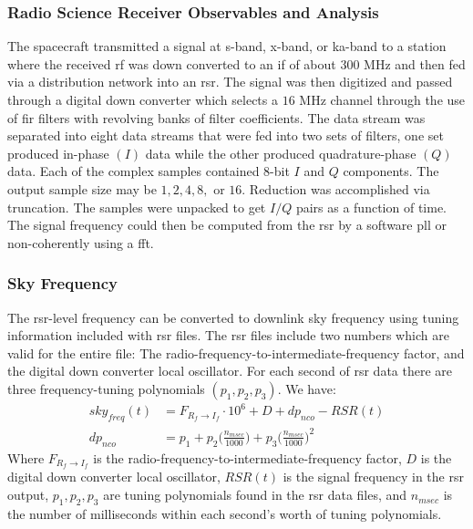 \documentclass[crop=false,class=article,oneside]{standalone}
\begin{document}
        \subsubsection{%
            Radio Science Receiver Observables and Analysis
        }
            The spacecraft transmitted a signal at
            \gls{s-band}, \gls{x-band}, or \gls{ka-band} to
            a station where the received \gls{rf} was down
            converted to an \gls{if} of about $300$ MHz and
            then fed via a \gls{distribution network} into
            an \gls{rsr}. The signal was then digitized and
            passed through a digital down converter which
            selects a $16$ MHz channel through the use of
            \gls{fir} filters with revolving banks of filter
            coefficients. The data stream was separated into
            eight  data streams
            that were fed into two sets of filters, one set
            produced \gls{in-phase} $(I)$ data while the other
            produced \gls{quadrature-phase} $(Q)$ data.
            Each of the complex samples contained 8-bit $I$
            and $Q$ components. The output sample size may be
            $1,2,4,8,$ or $16$. Reduction was accomplished via
            \gls{truncation}. The samples were unpacked to get
            $I/Q$ pairs as a function of time. The signal
            \gls{frequency} could then be computed from the
            \gls{rsr} by a software \gls{pll} or
            non-coherently using a \gls{fft}. 
        \subsubsection{\footnotesize Sky Frequency}
            The \gls{rsr}-level \gls{frequency} can be
            converted to \gls{downlink} \gls{sky frequency}
            using tuning information included with \gls{rsr}
            files. The \gls{rsr} files include two numbers
            which are valid for the entire file: The
            radio-frequency-to-intermediate-frequency factor,
            and the digital down converter local oscillator.
            For each second of \gls{rsr} data there are
            three \glspl{frequency-tuning polynomial}
            $(p_{1},p_{2},p_{3})$. We have:
            \begin{align}
                sky_{freq}(t)
                &=F_{R_{f}\rightarrow{I_{f}}}\cdot 10^{6}
                 +D+dp_{nco}-RSR(t)
                \label{equ:usr_sky_freq_t}\\
                dp_{nco}
                &=p_1
                 +p_2\bigg(\frac{n_{msec}}{1000}\bigg)
                 +p_3\bigg(\frac{n_{msec}}{1000}\bigg)^{2}
                \label{equ:usr_dp_nco}
            \end{align}
            Where $F_{R_{f}\rightarrow I_{f}}$ is the
            radio-frequency-to-intermediate-frequency factor,
            $D$ is the digital down converter local oscillator,
            $RSR(t)$ is the signal frequency in the \gls{rsr}
            output, $p_1,p_2,p_3$ are tuning polynomials
            found in the \gls{rsr} data files, and $n_{msec}$
            is the number of milliseconds within each
            second's worth of tuning polynomials. 
\end{document}

